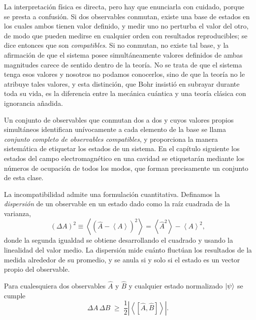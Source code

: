         La interpretación física es directa, pero hay que enunciarla con cuidado, porque se presta a confusión. Si dos observables conmutan, existe una base de estados en los cuales ambos tienen valor definido, y medir uno no perturba el valor del otro, de modo que pueden medirse en cualquier orden con resultados reproducibles; se dice entonces que son \textit{compatibles}. Si no conmutan, no existe tal base, y la afirmación de que el sistema posee simultáneamente valores definidos de ambas magnitudes carece de sentido dentro de la teoría. No se trata de que el sistema tenga esos valores y nosotros no podamos conocerlos, sino de que la teoría no le atribuye tales valores, y esta distinción, que Bohr insistió en subrayar durante toda su vida, es la diferencia entre la mecánica cuántica y una teoría clásica con ignorancia añadida.

        Un conjunto de observables que conmutan dos a dos y cuyos valores propios simultáneos identifican unívocamente a cada elemento de la base se llama \textit{conjunto completo de observables compatibles}, y proporciona la manera sistemática de etiquetar los estados de un sistema. En el capítulo siguiente los estados del campo electromagnético en una cavidad se etiquetarán mediante los números de ocupación de todos los modos, que forman precisamente un conjunto de esta clase.

        La incompatibilidad admite una formulación cuantitativa. Definamos la \textit{dispersión} de un observable en un estado dado como la raíz cuadrada de la varianza,
        \begin{equation}\label{eq:Dispersion}
            \left(\Delta A\right)^{2} \equiv \left\langle\left(\hat{A} - \left\langle A\right\rangle\right)^{2}\right\rangle = \left\langle \hat{A}^{2}\right\rangle - \left\langle A\right\rangle^{2},
        \end{equation}
        donde la segunda igualdad se obtiene desarrollando el cuadrado y usando la linealidad del valor medio. La dispersión mide cuánto fluctúan los resultados de la medida alrededor de su promedio, y se anula si y solo si el estado es un vector propio del observable.

        \begin{myteo}[Robertson]\label{teo:Robertson}
            Para cualesquiera dos observables $\hat{A}$ y $\hat{B}$ y cualquier estado normalizado $\ket{\psi}$ se cumple
            \begin{equation}\label{eq:Robertson}
                \Delta A\,\Delta B \;\geq\; \frac{1}{2}\left|\left\langle\left[\hat{A},\hat{B}\right]\right\rangle\right| .
            \end{equation}
        \end{myteo}

